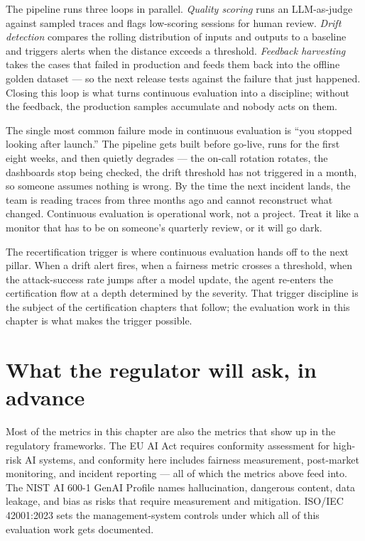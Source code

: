 The pipeline runs three loops in parallel. \textit{Quality scoring} runs an LLM-as-judge against sampled traces and flags low-scoring sessions for human review. \textit{Drift detection} compares the rolling distribution of inputs and outputs to a baseline and triggers alerts when the distance exceeds a threshold. \textit{Feedback harvesting} takes the cases that failed in production and feeds them back into the offline golden dataset --- so the next release tests against the failure that just happened. Closing this loop is what turns continuous evaluation into a discipline; without the feedback, the production samples accumulate and nobody acts on them.

\begin{TNwarning}
The single most common failure mode in continuous evaluation is ``you stopped looking after launch.'' The pipeline gets built before go-live, runs for the first eight weeks, and then quietly degrades --- the on-call rotation rotates, the dashboards stop being checked, the drift threshold has not triggered in a month, so someone assumes nothing is wrong. By the time the next incident lands, the team is reading traces from three months ago and cannot reconstruct what changed. Continuous evaluation is operational work, not a project. Treat it like a monitor that has to be on someone's quarterly review, or it will go dark.
\end{TNwarning}

The recertification trigger is where continuous evaluation hands off to the next pillar. When a drift alert fires, when a fairness metric crosses a threshold, when the attack-success rate jumps after a model update, the agent re-enters the certification flow at a depth determined by the severity. That trigger discipline is the subject of the certification chapters that follow; the evaluation work in this chapter is what makes the trigger possible.

\section{What the regulator will ask, in advance}

Most of the metrics in this chapter are also the metrics that show up in the regulatory frameworks. The EU AI Act \citep{euAIact2024} requires conformity assessment for high-risk AI systems, and conformity here includes fairness measurement, post-market monitoring, and incident reporting --- all of which the metrics above feed into. The NIST AI 600-1 GenAI Profile \citep{nist-genai-600-1} names hallucination, dangerous content, data leakage, and bias as risks that require measurement and mitigation. ISO/IEC 42001:2023 \citep{iso-iec-42001} sets the management-system controls under which all of this evaluation work gets documented.

